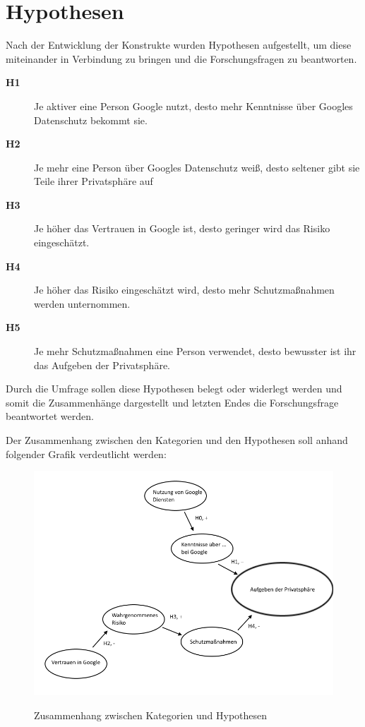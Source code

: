 \section{Hypothesen}
Nach der Entwicklung der Konstrukte wurden Hypothesen aufgestellt, um diese miteinander in Verbindung zu bringen und die Forschungsfragen zu beantworten.
\begin{description}
\item[\label{itm:H0}\textbf{H1}]Je aktiver eine Person Google nutzt, desto mehr Kenntnisse über Googles Datenschutz bekommt sie.
\item[\label{itm:H1}\textbf{H2}]Je mehr eine Person über Googles Datenschutz weiß, desto seltener gibt sie Teile ihrer Privatsphäre auf
\item[\label{itm:H2}\textbf{H3}]Je höher das Vertrauen in Google ist, desto geringer wird das Risiko eingeschätzt.
\item[\label{itm:H3}\textbf{H4}]Je höher das Risiko eingeschätzt wird, desto mehr Schutzmaßnahmen werden unternommen.
\item[\label{itm:H4}\textbf{H5}]Je mehr Schutzmaßnahmen eine Person verwendet, desto bewusster ist ihr das Aufgeben der Privatsphäre.
\end{description}

Durch die Umfrage sollen diese Hypothesen belegt oder widerlegt werden und somit die Zusammenhänge dargestellt und letzten Endes die Forschungsfrage beantwortet werden.

Der Zusammenhang zwischen den Kategorien und den Hypothesen soll anhand folgender Grafik verdeutlicht werden:
\begin{figure}[H]
\centering
\includegraphics[scale=0.55]{images/bubbles}\\
\caption{Zusammenhang zwischen Kategorien und Hypothesen}\label{bubbles}
\end{figure}

